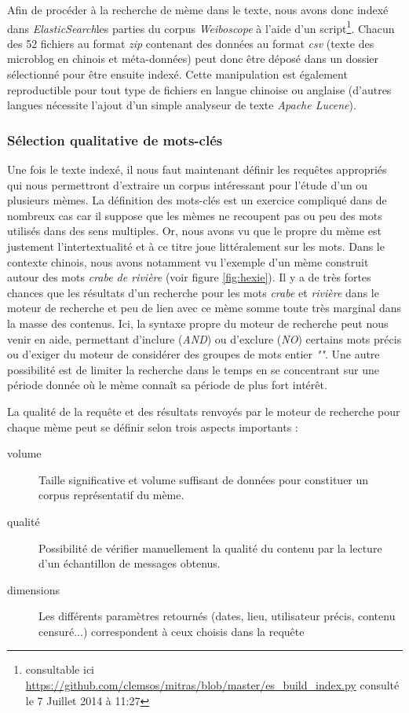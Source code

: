     Afin de procéder à la recherche de mème dans le texte, nous avons donc indexé dans \textit{ElasticSearch}les parties du corpus \textit{Weiboscope} à l'aide d'un script\footnote{consultable ici \url{https://github.com/clemsos/mitras/blob/master/es_build_index.py} consulté le 7 Juillet 2014 à 11:27}. Chacun des 52 fichiers au format \textit{zip} contenant des données au format \textit{csv} (texte des microblog en chinois et méta-données)  peut donc être déposé dans un dossier sélectionné pour être ensuite indexé. Cette manipulation est également reproductible pour tout type de fichiers en langue chinoise ou anglaise (d'autres langues nécessite l'ajout d'un simple analyseur de texte \textit{Apache Lucene}).

\subsubsection[Sélection qualitative de mots-clés]{Sélection qualitative de mots-clés}

    Une fois le texte indexé, il nous faut maintenant définir les requêtes appropriés qui nous permettront d'extraire un corpus intéressant pour l'étude d'un ou plusieurs mèmes. La définition des mots-clés est un exercice compliqué dans de nombreux cas car il suppose que les mèmes ne recoupent pas ou peu des mots utilisés dans des sens multiples. Or, nous avons vu que le propre du mème est justement l'intertextualité et à ce titre joue littéralement sur les mots. Dans le contexte chinois, nous avons notamment vu l'exemple d'un mème construit autour des mots \textit{crabe de rivière} (voir figure \ref{fig:hexie}). Il y a de très fortes chances que les résultats d'un recherche pour les mots \textit{crabe} et \textit{rivière} dans le moteur de recherche et peu de lien avec ce mème somme toute très marginal dans la masse des contenus. Ici, la syntaxe propre du moteur de recherche peut nous venir en aide, permettant d'inclure (\textit{AND}) ou d'exclure (\textit{NO}) certains mots précis ou d'exiger du moteur de considérer des groupes de mots entier \textit{""}. Une autre possibilité est de limiter la recherche dans le temps en se concentrant sur une période donnée où le  mème connaît sa période de plus fort intérêt.

    La qualité de la requête et des résultats renvoyés par le moteur de recherche pour chaque mème peut se définir  selon trois aspects importants :

    \begin{description}
        \item[volume]
            Taille significative et volume suffisant de données pour constituer un corpus représentatif du mème.
        \item[qualité]
            Possibilité de vérifier manuellement la qualité du contenu par la lecture d{\textquoteright}un échantillon de  messages obtenus.
        \item[dimensions]
            Les différents paramètres retournés (dates, lieu, utilisateur précis, contenu censuré...) correspondent à ceux choisis dans la requête
    \end{description}

